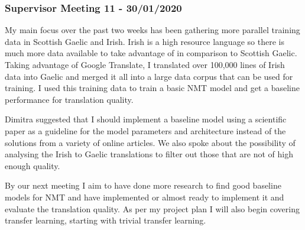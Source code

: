 \subsubsection{Supervisor Meeting 11 - 30/01/2020}
My main focus over the past two weeks has been gathering more parallel training data in Scottish Gaelic and Irish. Irish is a high resource language so there is much more data available to take advantage of in comparison to Scottish Gaelic. Taking advantage of Google Translate, I translated over 100,000 lines of Irish data into Gaelic and merged it all into a large data corpus that can be used for training. I used this training data to train a basic NMT model and get a baseline performance for translation quality.

Dimitra suggested that I should implement a baseline model using a scientific paper as a guideline for the model parameters and architecture instead of the solutions from a variety of online articles. We also spoke about the possibility of analysing the Irish to Gaelic translations to filter out those that are not of high enough quality.

By our next meeting I aim to have done more research to find good baseline models for NMT and have implemented or almost ready to implement it and evaluate the translation quality. As per my project plan I will also begin covering transfer learning, starting with trivial transfer learning.
